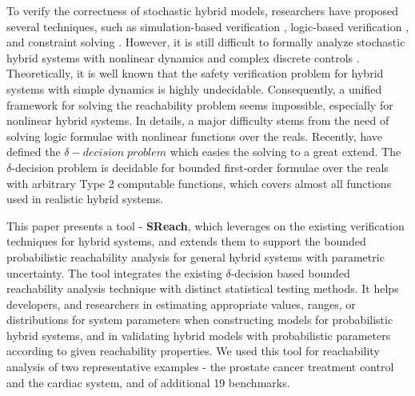 To verify the correctness of stochastic hybrid models, researchers have proposed several techniques, such as simulation-based verification \cite{zuliani2010bayesian, abate2007probabilistic}, logic-based verification \cite{platzer2011stochastic}, and constraint solving \cite{franzle2008stochastic}. However, it is still difficult to formally analyze stochastic hybrid systems with nonlinear dynamics and complex discrete controls \cite{alur2011formal, henzinger2000theory}. Theoretically, it is well known that the safety verification problem for hybrid systems with simple dynamics is highly undecidable. Consequently, a unified framework for solving the reachability problem seems impossible, especially for nonlinear hybrid systems. In details, a major difficulty stems from the need of solving logic formulae with nonlinear functions over the reals. Recently, \cite{gao2013dreal, gao2013satisfiability} have defined the $\delta-decision \;  problem$ which easies the solving to a great extend. The $\delta$-decision problem is decidable for bounded first-order formulae over the reals with arbitrary Type 2 computable functions, which covers almost all functions used in realistic hybrid systems.   

This paper presents a tool - {\bf SReach}, which leverages on the existing verification techniques for hybrid systems, and extends them to support the bounded probabilistic reachability analysis for general hybrid systems with parametric uncertainty. The tool integrates the existing $\delta$-decision based bounded reachability analysis technique \cite{gaodelta} with distinct statistical testing methods. It helps developers, and researchers in estimating appropriate values, ranges, or distributions for system parameters when constructing models for probabilistic hybrid systems, and in validating hybrid models with probabilistic parameters according to given reachability properties. We used this tool for reachability analysis of two representative examples - the prostate cancer treatment control and the cardiac system, and of additional 19 benchmarks.